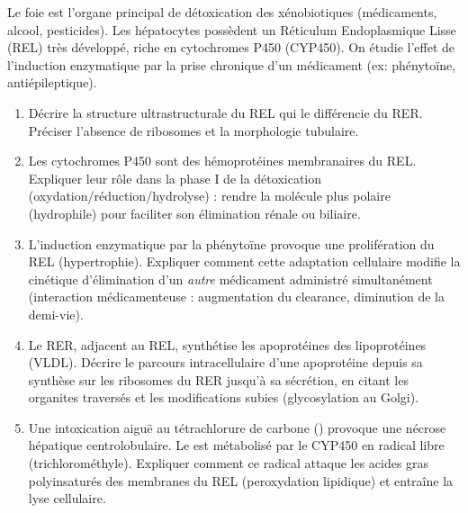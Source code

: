 \documentclass[11pt]{article}
\begin{document}
\begin{exercice}
Le foie est l'organe principal de détoxication des xénobiotiques (médicaments, alcool, pesticides). Les hépatocytes possèdent un Réticulum Endoplasmique Lisse (REL) très développé, riche en cytochromes P450 (CYP450). On étudie l'effet de l'induction enzymatique par la prise chronique d'un médicament (ex: phénytoïne, antiépileptique).

\begin{enumerate}
\item Décrire la structure ultrastructurale du REL qui le différencie du RER. Préciser l'absence de ribosomes et la morphologie tubulaire.
\item Les cytochromes P450 sont des hémoprotéines membranaires du REL. Expliquer leur rôle dans la phase I de la détoxication (oxydation/réduction/hydrolyse) : rendre la molécule plus polaire (hydrophile) pour faciliter son élimination rénale ou biliaire.
\item L'induction enzymatique par la phénytoïne provoque une prolifération du REL (hypertrophie). Expliquer comment cette adaptation cellulaire modifie la cinétique d'élimination d'un \textit{autre} médicament administré simultanément (interaction médicamenteuse : augmentation du clearance, diminution de la demi-vie).
\item Le RER, adjacent au REL, synthétise les apoprotéines des lipoprotéines (VLDL). Décrire le parcours intracellulaire d'une apoprotéine depuis sa synthèse sur les ribosomes du RER jusqu'à sa sécrétion, en citant les organites traversés et les modifications subies (glycosylation au Golgi).
\item Une intoxication aiguë au tétrachlorure de carbone () provoque une nécrose hépatique centrolobulaire. Le  est métabolisé par le CYP450 en radical libre  (trichlorométhyle). Expliquer comment ce radical attaque les acides gras polyinsaturés des membranes du REL (peroxydation lipidique) et entraîne la lyse cellulaire.
\end{enumerate}
\end{exercice}
\end{document}
